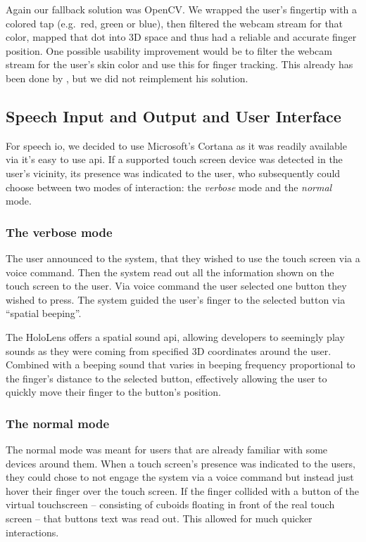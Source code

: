 Again our fallback solution was OpenCV.
We wrapped the user's fingertip with a colored tap (e.g.\ red, green or blue), then filtered the webcam stream for that color, mapped that dot into 3D space and thus had a reliable and accurate finger position.
One possible usability improvement would be to filter the webcam stream for the user's skin color and use this for finger tracking.
This already has been done by \textcite{fingertips}, but we did not reimplement his solution.


\subsection{Speech Input and Output and User Interface}
\label{subsec:ui}
\label{subsec:voiceio}
For speech \ac{io}, we decided to use Microsoft's Cortana as it was readily available via it's easy to use \ac{api}.
If a supported touch screen device was detected in the user's vicinity, its presence was indicated to the user, who subsequently could choose between two modes of interaction: the \emph{verbose} mode and the \emph{normal} mode.

\subsubsection{The verbose mode}
The user announced to the system, that they wished to use the touch screen via a voice command.
Then the system read out all the information shown on the touch screen to the user.
Via voice command the user selected one button they wished to press.
The system guided the user's finger to the selected button via \enquote{spatial beeping}.

The HoloLens offers a spatial sound \ac{api}, allowing developers to seemingly play sounds as they were coming from specified 3D coordinates around the user.
Combined with a beeping sound that varies in beeping frequency proportional to the finger's distance to the selected button, effectively allowing the user to quickly move their finger to the button's position.

\subsubsection{The normal mode}
The normal mode was meant for users that  are already familiar with some devices around them.
When a touch screen's presence was indicated to the users, they could chose to not engage the system via a voice command but instead just hover their finger over the touch screen.
If the finger collided with a button of the virtual touchscreen -- consisting of cuboids floating in front of the real touch screen -- that buttons text was read out.
This allowed for much quicker interactions.

